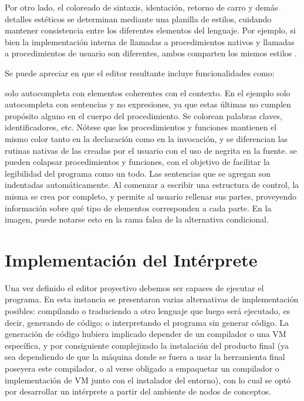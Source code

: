 \centertree{
  [BinaryOperation
    [{Plus(alias='+')}]
    [{Div(alias='/')}]
    [...]
  ]  
}

Por otro lado, el coloreado de sintaxis, identación, retorno de carro y demás detalles estéticos se determinan mediante una planilla de estilos, cuidando mantener consistencia entre los diferentes elementos del lenguaje. Por ejemplo, si bien la implementación interna de llamadas a procedimientos nativos y llamadas a procedimientos de usuario son diferentes, ambos comparten los mismos estilos .


Se puede apreciar en  que el editor resultante incluye funcionalidades como:
\begin{itemize}
 solo autocompleta con elementos coherentes con el contexto. En el ejemplo solo autocompleta con sentencias y no expresiones, ya que estas últimas no cumplen propósito alguno en el cuerpo del procedimiento.
 Se colorean palabras claves, identificadores, etc. Nótese que los procedimientos y funciones mantienen el mismo color tanto en la declaración como en la invocación, y se diferencian las rutinas nativas de las creadas por el usuario con el uso de negrita en la fuente.
 se pueden colapsar procedimientos y funciones, con el objetivo de facilitar la legibilidad del programa como un todo.
 Las sentencias que se agregan son indentadas automáticamente.
 Al comenzar a escribir una estructura de control, la misma se crea por completo, y permite al usuario rellenar sus partes, proveyendo información sobre qué tipo de elementos corresponden a cada parte. En la imagen, puede notarse esto en la rama falsa de la alternativa condicional.
\end{itemize}




\section{Implementación del Intérprete}\label{interprete}

Una vez definido el editor proyectivo debemos ser capaces de ejecutar el programa. En esta instancia se presentaron varias alternativas de implementación posibles: compilando o traduciendo a otro lenguaje que luego será ejecutado, es decir, generando de código; o interpretando el programa sin generar código. La generación de código hubiera implicado depender de un compilador o una VM específica, y por consiguiente complejizado la instalación del producto final (ya sea dependiendo de que la máquina donde se fuera a usar la herramienta final poseyera este compilador, o al verse obligado a empaquetar un compilador o implementación de VM junto con el instalador del entorno), con lo cual se optó por desarrollar un intérprete a partir del ambiente de nodos de conceptos.

